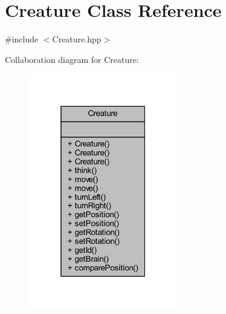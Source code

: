 \hypertarget{class_creature}{}\section{Creature Class Reference}
\label{class_creature}


{\ttfamily \#include $<$Creature.\+hpp$>$}



Collaboration diagram for Creature\+:\nopagebreak
\begin{figure}[H]
\begin{center}
\leavevmode
\includegraphics[width=184pt]{class_creature__coll__graph}
\end{center}
\end{figure}
